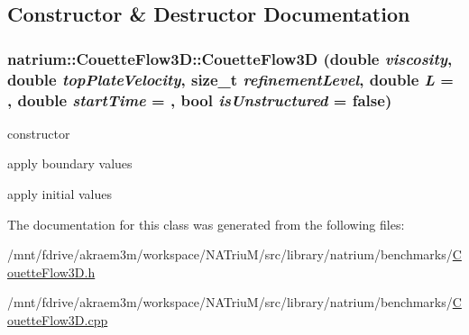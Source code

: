 \subsection{Constructor \& Destructor Documentation}
\hypertarget{classnatrium_1_1CouetteFlow3D_ae7dd1be0d19989bb3b015492b59c0e06}{
\subsubsection[{CouetteFlow3D}]{\setlength{\rightskip}{0pt plus 5cm}natrium::CouetteFlow3D::CouetteFlow3D (double {\em viscosity}, \/  double {\em topPlateVelocity}, \/  size\_\-t {\em refinementLevel}, \/  double {\em L} = {}, \/  double {\em startTime} = {}, \/  bool {\em isUnstructured} = {\ttfamily false})}}
\label{classnatrium_1_1CouetteFlow3D_ae7dd1be0d19989bb3b015492b59c0e06}


constructor 

apply boundary values

apply initial values 

The documentation for this class was generated from the following files:\begin{DoxyCompactItemize}
\item 
/mnt/fdrive/akraem3m/workspace/NATriuM/src/library/natrium/benchmarks/\hyperlink{CouetteFlow3D_8h}{CouetteFlow3D.h}\item 
/mnt/fdrive/akraem3m/workspace/NATriuM/src/library/natrium/benchmarks/\hyperlink{CouetteFlow3D_8cpp}{CouetteFlow3D.cpp}\end{DoxyCompactItemize}
